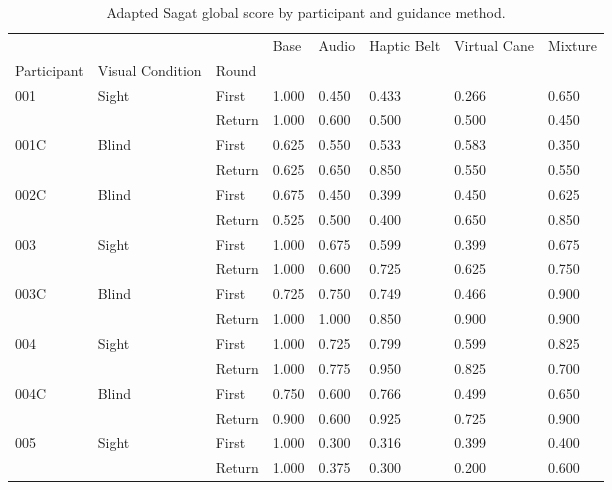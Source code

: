
\begin{table}[!htb]
\centering
\caption{Adapted Sagat global score by participant and guidance method.}
\label{tab:sagat}
\begin{tabular}{llllllll}
\toprule
    &       &        &  Base & Audio & Haptic Belt & Virtual Cane & Mixture \\
Participant & Visual Condition & Round &       &       &             &              &         \\
\midrule
001 & Sight & First & 1.000 & 0.450 &       0.433 &        0.266 &   0.650 \\
    &       & Return & 1.000 & 0.600 &       0.500 &        0.500 &   0.450 \\
001C & Blind & First & 0.625 & 0.550 &       0.533 &        0.583 &   0.350 \\
    &       & Return & 0.625 & 0.650 &       0.850 &        0.550 &   0.550 \\
002C & Blind & First & 0.675 & 0.450 &       0.399 &        0.450 &   0.625 \\
    &       & Return & 0.525 & 0.500 &       0.400 &        0.650 &   0.850 \\
003 & Sight & First & 1.000 & 0.675 &       0.599 &        0.399 &   0.675 \\
    &       & Return & 1.000 & 0.600 &       0.725 &        0.625 &   0.750 \\
003C & Blind & First & 0.725 & 0.750 &       0.749 &        0.466 &   0.900 \\
    &       & Return & 1.000 & 1.000 &       0.850 &        0.900 &   0.900 \\
004 & Sight & First & 1.000 & 0.725 &       0.799 &        0.599 &   0.825 \\
    &       & Return & 1.000 & 0.775 &       0.950 &        0.825 &   0.700 \\
004C & Blind & First & 0.750 & 0.600 &       0.766 &        0.499 &   0.650 \\
    &       & Return & 0.900 & 0.600 &       0.925 &        0.725 &   0.900 \\
005 & Sight & First & 1.000 & 0.300 &       0.316 &        0.399 &   0.400 \\
    &       & Return & 1.000 & 0.375 &       0.300 &        0.200 &   0.600 \\
\bottomrule
\end{tabular}
\end{table}

